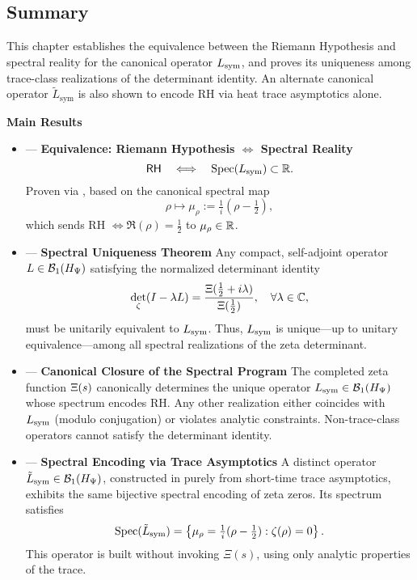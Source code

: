 \subsection*{Summary}

This chapter establishes the equivalence between the Riemann Hypothesis and spectral reality for the canonical operator \( L_{\mathrm{sym}} \), and proves its uniqueness among trace-class realizations of the determinant identity. An alternate canonical operator \( \tilde{L}_{\mathrm{sym}} \) is also shown to encode RH via heat trace asymptotics alone.

\textbf{Main Results}
\begin{itemize}
  \item {} — \textbf{Equivalence: Riemann Hypothesis \( \iff \) Spectral Reality}
  \[
  \mathsf{RH} \quad \Longleftrightarrow \quad \operatorname{Spec}(L_{\mathrm{sym}}) \subset \mathbb{R}.
  \]
  Proven via , based on the canonical spectral map
  \[
  \rho \mapsto \mu_\rho := \tfrac{1}{i}(\rho - \tfrac{1}{2}),
  \]
  which sends RH \( \iff \Re(\rho) = \tfrac{1}{2} \) to \( \mu_\rho \in \mathbb{R} \).

  \item {} — \textbf{Spectral Uniqueness Theorem}
  Any compact, self-adjoint operator \( L \in \mathcal{B}_1(H_{\Psi}) \) satisfying the normalized determinant identity
  \[
  \det_\zeta(I - \lambda L) = \frac{\Xi(\tfrac{1}{2} + i\lambda)}{\Xi(\tfrac{1}{2})}, \quad \forall \lambda \in \mathbb{C},
  \]
  must be unitarily equivalent to \( L_{\mathrm{sym}} \). Thus, \( L_{\mathrm{sym}} \) is unique—up to unitary equivalence—among all spectral realizations of the zeta determinant.

  \item {} — \textbf{Canonical Closure of the Spectral Program}
  The completed zeta function \( \Xi(s) \) canonically determines the unique operator \( L_{\mathrm{sym}} \in \mathcal{B}_1(H_{\Psi}) \) whose spectrum encodes RH. Any other realization either coincides with \( L_{\mathrm{sym}} \) (modulo conjugation) or violates analytic constraints. Non-trace-class operators cannot satisfy the determinant identity.

  \item {} — \textbf{Spectral Encoding via Trace Asymptotics}
  A distinct operator \( \tilde{L}_{\mathrm{sym}} \in \mathcal{B}_1(H_{\Psi}) \), constructed in  purely from short-time trace asymptotics, exhibits the same bijective spectral encoding of zeta zeros. Its spectrum satisfies
  \[
  \operatorname{Spec}(\tilde{L}_{\mathrm{sym}}) = \left\{ \mu_\rho = \tfrac{1}{i}(\rho - \tfrac{1}{2}) : \zeta(\rho) = 0 \right\}.
  \]
  This operator is built without invoking \( \Xi(s) \), using only analytic properties of the trace.

\end{itemize}

